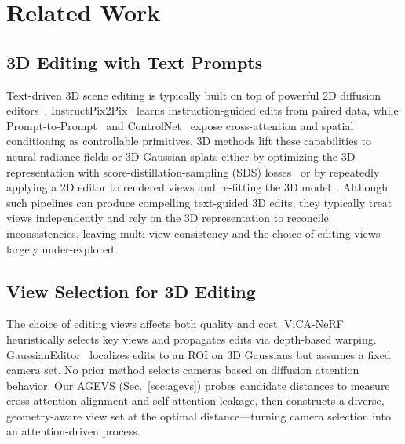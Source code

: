 
\section{Related Work}
\label{sec:related}

\subsection{3D Editing with Text Prompts}

Text-driven 3D scene editing is typically built on top of powerful 2D diffusion editors~\cite{rombach2022high,brooks2023instructpix2pix,hertz2022prompt2prompt,zhang2023controlnet}.
InstructPix2Pix~\cite{brooks2023instructpix2pix} learns instruction-guided edits from paired data, while Prompt-to-Prompt~\cite{hertz2022prompt2prompt} and ControlNet~\cite{zhang2023controlnet} expose cross-attention and spatial conditioning as controllable primitives.
3D methods lift these capabilities to neural radiance fields or 3D Gaussian splats either by optimizing the 3D representation with score-distillation-sampling (SDS) losses~\cite{poole2022dreamfusion,wang2024gaussianeditor} or by repeatedly applying a 2D editor to rendered views and re-fitting the 3D model~\cite{haque2023instructnerf2nerf,chen2024dge}.
Although such pipelines can produce compelling text-guided 3D edits, they typically treat views independently and rely on the 3D representation to reconcile inconsistencies, leaving multi-view consistency and the choice of editing views largely under-explored.

\subsection{View Selection for 3D Editing}

The choice of editing views affects both quality and cost.
ViCA-NeRF~\cite{huang2024vicanerf} heuristically selects key views and propagates edits via depth-based warping.
GaussianEditor~\cite{wang2024gaussianeditor} localizes edits to an ROI on 3D Gaussians but assumes a fixed camera set.
No prior method selects cameras based on diffusion attention behavior.
Our AGEVS (Sec.~\ref{sec:agevs}) probes candidate distances to measure cross-attention alignment and self-attention leakage, then constructs a diverse, geometry-aware view set at the optimal distance---turning camera selection into an attention-driven process.

